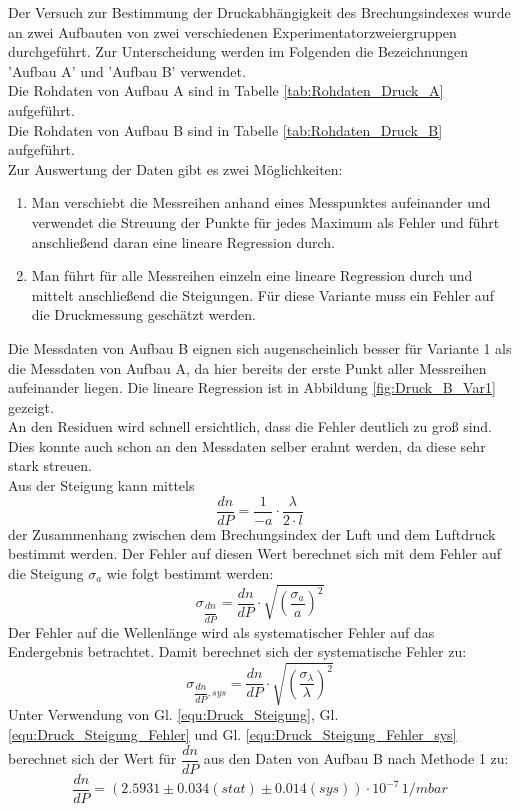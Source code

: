 \documentclass[12pt,a4paper]{article}
\begin{document}
Der Versuch zur Bestimmung der Druckabhängigkeit des Brechungsindexes wurde an zwei Aufbauten von zwei verschiedenen Experimentatorzweiergruppen durchgeführt. Zur Unterscheidung werden im Folgenden die Bezeichnungen 'Aufbau A' und 'Aufbau B' verwendet.\\
Die Rohdaten von Aufbau A sind in Tabelle \ref{tab:Rohdaten_Druck_A} aufgeführt.\\
Die Rohdaten von Aufbau B sind in Tabelle \ref{tab:Rohdaten_Druck_B} aufgeführt.\\
Zur Auswertung der Daten gibt es zwei Möglichkeiten:
\begin{enumerate}
\item Man verschiebt die Messreihen anhand eines Messpunktes aufeinander und verwendet die Streuung der Punkte für jedes Maximum als Fehler und führt anschließend daran eine lineare Regression durch. 
\item Man führt für alle Messreihen einzeln eine lineare Regression durch und mittelt anschließend die Steigungen. Für diese Variante muss ein Fehler auf die Druckmessung geschätzt werden.
\end{enumerate}
Die Messdaten von Aufbau B eignen sich augenscheinlich besser für Variante 1 als die Messdaten von Aufbau A, da hier bereits der erste Punkt aller Messreihen aufeinander liegen. Die lineare Regression ist in Abbildung \ref{fig:Druck_B_Var1} gezeigt. \\
An den Residuen wird schnell ersichtlich, dass die Fehler deutlich zu groß sind. Dies konnte auch schon an den Messdaten selber erahnt werden, da diese sehr stark streuen.\\
Aus der Steigung kann mittels 
\begin{equation}
\dfrac{dn}{dP} = \dfrac{1}{-a} \cdot \dfrac{\lambda}{2 \cdot l}
\label{equ:Druck_Steigung}
\end{equation}
der Zusammenhang zwischen dem Brechungsindex der Luft und dem Luftdruck bestimmt werden. Der Fehler auf diesen Wert berechnet sich mit dem Fehler auf die Steigung $\sigma _a$ wie folgt bestimmt werden:
\begin{equation}
\sigma _{\dfrac{dn}{dP}} = \dfrac{dn}{dP} \cdot \sqrt{\left( \dfrac{\sigma_ a}{a} \right) ^2}
\label{equ:Druck_Steigung_Fehler}
\end{equation}
Der Fehler auf die Wellenlänge wird als systematischer Fehler auf das Endergebnis betrachtet. Damit berechnet sich der systematische Fehler zu:
\begin{equation}
\sigma _{\dfrac{dn}{dP}, sys} = \dfrac{dn}{dP} \cdot \sqrt{\left( \dfrac{\sigma_ \lambda}{\lambda} \right) ^2}
\label{equ:Druck_Steigung_Fehler_sys}
\end{equation}
Unter Verwendung von Gl. \ref{equ:Druck_Steigung}, Gl. \ref{equ:Druck_Steigung_Fehler} und Gl. \ref{equ:Druck_Steigung_Fehler_sys} berechnet sich der Wert für $\dfrac{dn}{dP}$ aus den Daten von Aufbau B nach Methode 1 zu:
\begin{equation*}
\dfrac{dn}{dP} = (2.5931 \pm 0.034 (stat) \pm 0.014 (sys)) \cdot 10^{-7} \, \si{1/mbar}
\end{equation*}
\end{document}
